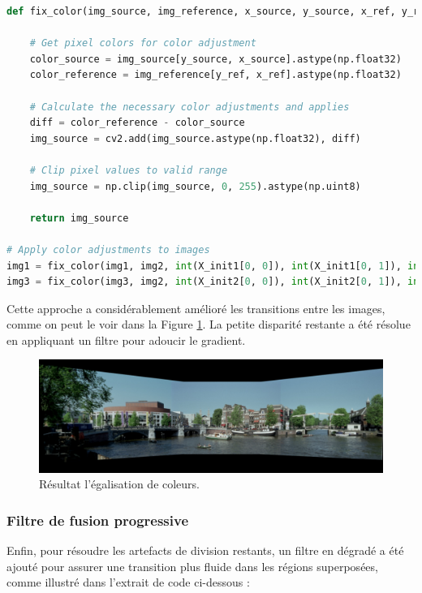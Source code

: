 \documentclass[../5RO17_TP1.tex]{subfiles}
\begin{document}
\begin{scriptsize}\mycode
	\begin{lstlisting}[language=Python]
def fix_color(img_source, img_reference, x_source, y_source, x_ref, y_ref):

    # Get pixel colors for color adjustment
    color_source = img_source[y_source, x_source].astype(np.float32)
    color_reference = img_reference[y_ref, x_ref].astype(np.float32)

    # Calculate the necessary color adjustments and applies
    diff = color_reference - color_source
    img_source = cv2.add(img_source.astype(np.float32), diff)

    # Clip pixel values to valid range
    img_source = np.clip(img_source, 0, 255).astype(np.uint8)

    return img_source

# Apply color adjustments to images
img1 = fix_color(img1, img2, int(X_init1[0, 0]), int(X_init1[0, 1]), int(X_final1[0, 0]), int(X_final1[0, 1]))
img3 = fix_color(img3, img2, int(X_init2[0, 0]), int(X_init2[0, 1]), int(X_final2[0, 0]), int(X_final2[0, 1]))
	\end{lstlisting}
\end{scriptsize}

Cette approche a considérablement amélioré les transitions entre les images, comme on peut le voir dans la Figure \ref{fig:ams2}. La petite disparité restante a été résolue en appliquant un filtre pour adoucir le gradient.

\begin{figure}[h]
    \centering
    \includegraphics[width=1\linewidth]{images/amsterdam_sans_blend.png}
    \caption{Résultat l'égalisation de coleurs.}
    \label{fig:ams2}
\end{figure}


\subsubsection{Filtre de fusion progressive}

Enfin, pour résoudre les artefacts de division restants, un filtre en dégradé a été ajouté pour assurer une transition plus fluide dans les régions superposées, comme illustré dans l'extrait de code ci-dessous :
\end{document}
